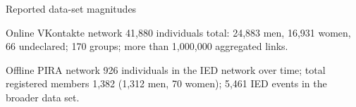 \begin{frame}{Reported data-set magnitudes}
  \begin{block}{Online VKontakte network}
    41,880 individuals total: 24,883 men, 16,931 women, 66 undeclared; 170 groups; more than 1,000,000 aggregated links.
  \end{block}

  \begin{block}{Offline PIRA network}
    926 individuals in the IED network over time; total registered members 1,382 (1,312 men, 70 women); 5,461 IED events in the broader data set.
  \end{block}

\end{frame}
